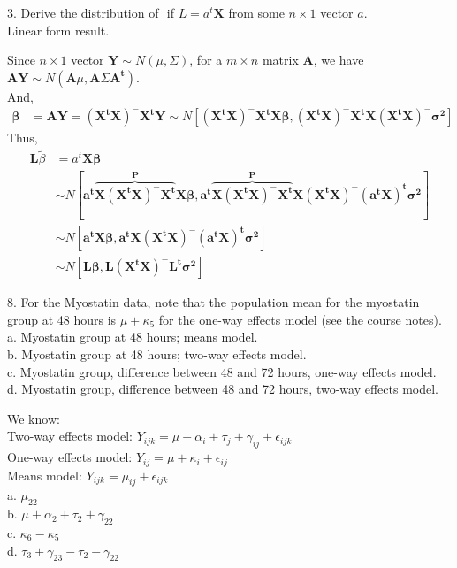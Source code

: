 \documentclass[12pt, utf8]{article}
\begin{document}
\newenvironment{problem}{\begin{framed}\begin{bfseries}}{\end{bfseries}\end{framed}\vspace{14pt}}


\begin{problem}

3. Derive the distribution of $ $ if $ L = a^t\boldsymbol{X}$ from some $ n\times 1$ vector $a$. \\
Linear form result.  
\end{problem}
Since $n \times 1$ vector $\boldsymbol{Y} \sim N(\mu, \Sigma)$,
for a $m\times n$ matrix $\boldsymbol{A}$, we have $\boldsymbol{AY} \sim N(\boldsymbol{A}\mu, \boldsymbol{A}\Sigma \boldsymbol{A^{t}})$. \\
And, 
\begin{align*} 
\boldsymbol{\beta} &=  \boldsymbol{AY} =  \boldsymbol{(X^{t}X)^{-}X^{t}Y} \sim N[\boldsymbol{(X^{t}X)^{-}X^{t}X\beta}, \boldsymbol{(X^{t}X)^{-}X^{t}X(X^{t}X)^{-}\sigma^{2}}]
\end{align*}
Thus, 
\begin{equation} 
\begin{split}
\boldsymbol{L}\widetilde{\beta} & = a^t\boldsymbol{X\beta} \\
 & \sim N[\boldsymbol{a^{t} \overbrace{X(X^{t}X)^{-}X^{t}}^{P}X\beta}, \boldsymbol{a^{t} \overbrace{X(X^{t}X)^{-}X^{t}}^{P}X(X^{t}X)^{-}(a^tX)^t\sigma^{2}}] \\
& \sim N[\boldsymbol{a^tX \beta},\boldsymbol{a^tX (X^{t}X)^{-}(a^tX)^t \sigma^2}] \\
& \sim N[\boldsymbol{L\beta},\boldsymbol{L(X^{t}X)^{-}L^{t}\sigma^2}]
\end{split}
\end{equation}

\begin{problem}
8. For the Myostatin data, note that the population mean for the myostatin group at 48 hours is $\mu + \kappa_5$ for the one-way effects model (see the course notes).\\
a. Myostatin group at 48 hours; means model. \\
b. Myostatin group at 48 hours; two-way effects model. \\
c. Myostatin group, difference between 48 and 72 hours, one-way effects model. \\
d. Myostatin group, difference between 48 and 72 hours, two-way effects model. 
\end{problem}
We know: \\
Two-way effects model: $Y_{ijk} = \mu + \alpha_i + \tau_j + \gamma_{ij} + \epsilon_{ijk} $\\
One-way effects model: $Y_{ij} = \mu + \kappa_i + \epsilon_{ij}$\\
Means model: $Y_{ijk} = \mu_{ij} + \epsilon_{ijk} $ \\              
a. $\mu_{22}$ \\
b. $\mu + \alpha_2 + \tau_2 + \gamma_{22}$ \\
c. $\kappa_6 - \kappa_5 $\\
d. $\tau_3 + \gamma_{23} - \tau_2 - \gamma_{22}$
\end{document}
